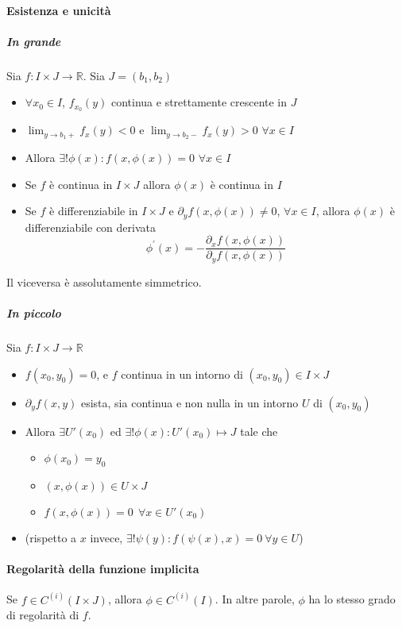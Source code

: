 \documentclass[a4paper,12pt]{article}
\begin{document}
\paragraph{Esistenza e unicità}
\subparagraph{In grande}
Sia $f: I \times J \rightarrow \mathbb{R}$. Sia $J = (b_1, b_2)$
\begin{itemize}
 \item $\forall x_0 \in I$, $f_{x_0}(y) $ continua e strettamente crescente in $J$
 \item $\displaystyle\lim_{y \to b_1+}f_x(y) < 0$ e $\displaystyle\lim_{y \to b_2-} f_x(y) > 0$ $\forall x \in I$
 \item Allora $\exists ! \phi(x): f(x, \phi(x)) = 0$ $\forall x \in I$
 \item Se $f$ è continua in $I\times J$ allora $\phi(x)$ è continua in $I$
 \item Se $f$ è differenziabile in $I\times J$ e $\partial_y f(x, \phi(x))\neq 0$, $\forall x\in I$, allora $\phi(x)$ è differenziabile con derivata 
 \begin{displaymath}
 \phi^{'}(x)=-\frac{\partial_x f(x, \phi(x))}{\partial_y f(x, \phi(x))}
 \end{displaymath}
\end{itemize}
Il viceversa è assolutamente simmetrico.
\subparagraph{In piccolo}
Sia $f: I \times J \rightarrow \mathbb{R}$
\begin{itemize}
 \item $f(x_0, y_0) = 0$, e $f$ continua in un intorno di $(x_0, y_0) \in I\times J$
 \item $\partial_y f(x, y)$ esista, sia continua e non nulla in un intorno $U$ di $(x_0, y_0)$
 \item Allora $\exists U'(x_0)$ ed $\exists ! \phi(x): U'(x_0) \mapsto J$ tale che
 \begin{itemize}
 \item $ \phi(x_0)= y_0$
 \item $ (x, \phi(x)) \in U\times J $
 \item $f(x, \phi(x)) = 0 \ \ \forall x \in U'(x_0)$
 \end{itemize}
 \item (rispetto a $x$ invece, $\exists ! \psi(y): f(\psi(x), x) = 0\ \forall y \in U$)
\end{itemize}

\paragraph{Regolarità della funzione implicita}
Se $f\in C^{(i)} (I \times J)$, allora $\phi\in C^{(i)}(I)$. In altre parole, $\phi$ ha lo stesso grado di regolarità di $f$.
\end{document}
